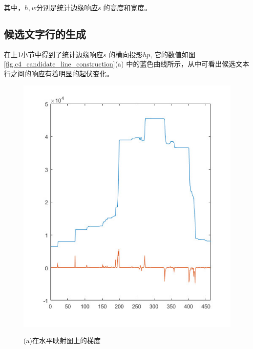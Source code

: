         其中，$h,w$分别是统计边缘响应$s$ 的高度和宽度。

        \subsection{候选文字行的生成}

        在上1小节中得到了统计边缘响应$s$ 的横向投影$hp$, 它的数值如图\ref{fig.c4_candidate_line_construction}(a) 中的蓝色曲线所示，从中可看出候选文本行之间的响应有着明显的起伏变化。

        \begin{figure}[!h]
        \begin{minipage}[t]{0.32\linewidth}
        \centering
        \includegraphics[width=\textwidth]{./figures/c4_gradient.jpg}
        \centerline{\small (a)在水平映射图上的梯度}
        \end{minipage}
        \begin{minipage}[t]{0.32\linewidth}
        \centering

\end{minipage}
\end{figure}
